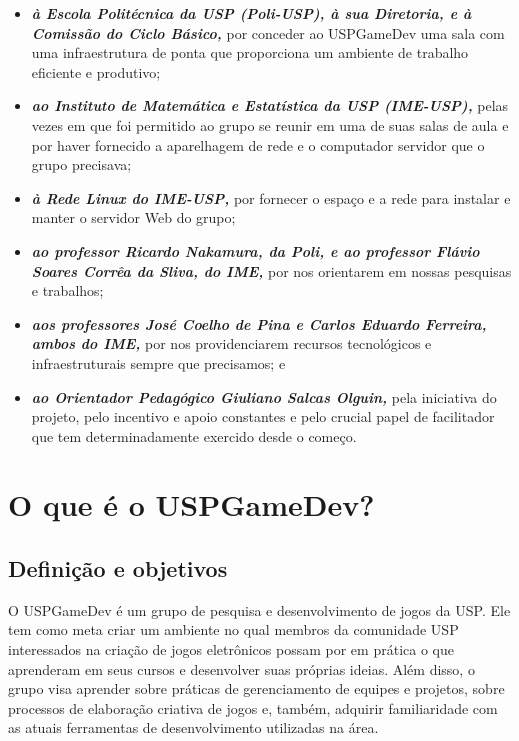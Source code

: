 \documentclass[12pt,onecolumn,a4paper]{article}
\begin{document}
    \begin{itemize}
    
        \item{\textit{\textbf{à Escola Politécnica da USP (Poli-USP), à sua Diretoria, e à Comissão
                              do Ciclo Básico,}}}
            por conceder ao USPGameDev uma sala com uma infraestrutura de ponta que proporciona um
            ambiente de trabalho eficiente e produtivo;
            
        \item{\textit{\textbf{ao Instituto de Matemática e Estatística da USP (IME-USP),}}}
            pelas vezes em que foi permitido ao grupo se reunir em uma de suas salas de aula e por
            haver fornecido a aparelhagem de rede e o computador servidor que o grupo precisava;
        
        \item{\textit{\textbf{à Rede Linux do IME-USP,}}}
            por fornecer o espaço e a rede para instalar e manter o servidor Web do grupo;
            
        \item{\textit{\textbf{ao professor Ricardo Nakamura, da Poli, e ao professor Flávio Soares
                              Corrêa da Sliva, do IME,}}}
            por nos orientarem em nossas pesquisas e trabalhos;
            
        \item{\textit{\textbf{aos professores José Coelho de Pina e Carlos Eduardo Ferreira, ambos
                              do IME,}}}
            por nos providenciarem recursos tecnológicos e infraestruturais sempre que precisamos; e 
                              
        \item{\textit{\bf ao Orientador Pedagógico Giuliano Salcas Olguin,}}
            pela iniciativa do projeto, pelo incentivo e apoio constantes e pelo crucial papel de
            facilitador que tem determinadamente exercido desde o começo.
        
    \end{itemize}
        
\clearpage
\section{\LARGE O que é o USPGameDev?}

    \subsection{Definição e objetivos}
        O USPGameDev é um grupo de pesquisa e desenvolvimento de jogos da USP. Ele tem como meta
        criar um ambiente no qual membros da comunidade USP interessados na criação de jogos
        eletrônicos possam por em prática o que aprenderam em seus cursos e desenvolver suas
        próprias ideias. Além disso, o grupo visa aprender sobre práticas de gerenciamento de
        equipes e projetos, sobre processos de elaboração criativa de jogos e, também, adquirir
        familiaridade com as atuais ferramentas de desenvolvimento utilizadas na área.
    
\end{document}
